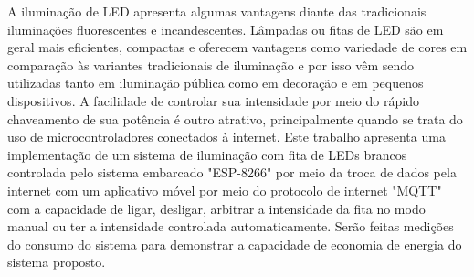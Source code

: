 A iluminação de LED apresenta algumas vantagens diante das tradicionais iluminações fluorescentes e incandescentes. Lâmpadas ou fitas de LED são em geral mais eficientes, compactas e oferecem vantagens como variedade de cores em comparação às variantes tradicionais de iluminação e por isso vêm sendo utilizadas tanto em iluminação pública como em decoração e em pequenos dispositivos. A facilidade de controlar sua intensidade por meio do rápido chaveamento de sua potência é outro atrativo, principalmente quando se trata do uso de microcontroladores conectados à internet. Este trabalho apresenta uma implementação de um sistema de iluminação com fita de LEDs brancos controlada pelo sistema embarcado "ESP-8266" por meio da troca de dados pela internet com um aplicativo móvel por meio do protocolo de internet "MQTT" com a capacidade de ligar, desligar, arbitrar a intensidade da fita no modo manual ou ter a intensidade controlada automaticamente. Serão feitas medições do consumo do sistema para demonstrar a capacidade de economia de energia do sistema proposto.

